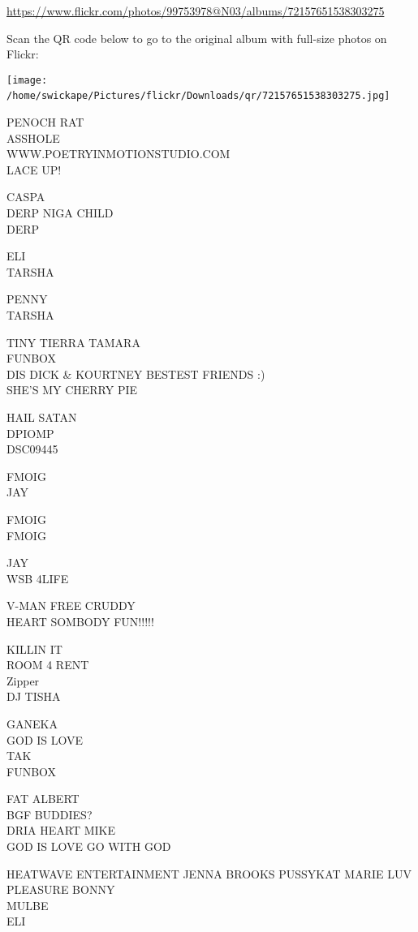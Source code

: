 \documentclass[10pt,letterpaper]{article}
\begin{document}
\url{https://www.flickr.com/photos/99753978@N03/albums/72157651538303275}

Scan the QR code below to go to the original album with full-size photos on Flickr:

\texttt{[image: /home/swickape/Pictures/flickr/Downloads/qr/72157651538303275.jpg]}
\

PENOCH RAT\\
ASSHOLE\\
WWW.POETRYINMOTIONSTUDIO.COM\\
LACE UP!

CASPA\\
DERP NIGA CHILD\\
DERP

ELI\\
TARSHA

PENNY\\
TARSHA

TINY TIERRA TAMARA\\
FUNBOX\\
DIS DICK \& KOURTNEY BESTEST FRIENDS :)\\
SHE'S MY CHERRY PIE

HAIL SATAN\\
DPIOMP\\
DSC09445

FMOIG\\
JAY

FMOIG\\
FMOIG

JAY\\
WSB 4LIFE

V{-}MAN FREE CRUDDY\\
HEART SOMBODY FUN!!!!!

KILLIN IT\\
ROOM 4 RENT\\
Zipper\\
DJ TISHA

GANEKA\\
GOD IS LOVE\\
TAK\\
FUNBOX

FAT ALBERT\\
BGF BUDDIES?\\
DRIA HEART MIKE\\
GOD IS LOVE GO WITH GOD

HEATWAVE ENTERTAINMENT JENNA BROOKS PUSSYKAT MARIE LUV PLEASURE BONNY\\
MULBE\\
ELI
\end{document}
